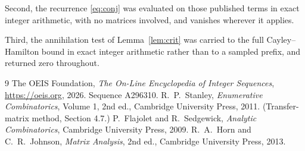 \documentclass[11pt,a4paper]{article}
\theoremstyle{plain}
\theoremstyle{definition}
\begin{document}
Second, the recurrence \eqref{eq:conj} was evaluated on those published terms in exact
integer arithmetic, with no matrices involved, and vanishes wherever it applies.

Third, the annihilation test of Lemma~\ref{lem:crit} was carried to the full
Cayley--Hamilton bound in exact integer arithmetic rather than to a sampled prefix, and
returned zero throughout.

\begin{thebibliography}{9}
 The OEIS Foundation, \emph{The On-Line Encyclopedia of Integer
Sequences}, \url{https://oeis.org}, 2026. Sequence A296310.
 R.~P.~Stanley, \emph{Enumerative Combinatorics}, Volume 1, 2nd ed.,
Cambridge University Press, 2011. (Transfer-matrix method, Section 4.7.)
 P.~Flajolet and R.~Sedgewick, \emph{Analytic Combinatorics}, Cambridge
University Press, 2009.
 R.~A.~Horn and C.~R.~Johnson, \emph{Matrix Analysis}, 2nd ed., Cambridge
University Press, 2013.
\end{thebibliography}
\end{document}

